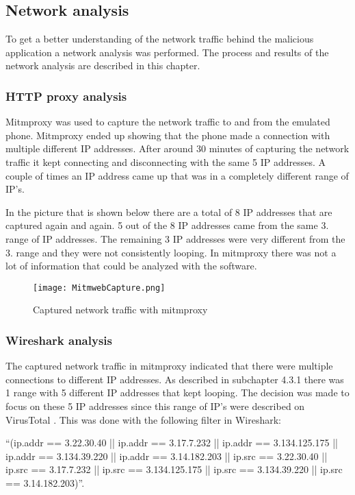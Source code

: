 \subsection{Network analysis}
To get a better understanding of the network traffic behind the malicious application a network analysis was performed. The process and results of the network analysis are described in this chapter.

\subsubsection{HTTP proxy analysis}
Mitmproxy was used to capture the network traffic to and from the emulated phone. Mitmproxy ended up showing that the phone made a connection with multiple different IP addresses. After around 30 minutes of capturing the network traffic it kept connecting and disconnecting with the same 5 IP addresses. A couple of times an IP address came up that was in a completely different range of IP’s. 

In the picture that is shown below there are a total of 8 IP addresses that are captured again and again. 5 out of the 8 IP addresses came from the same 3. range of IP addresses. The remaining 3 IP addresses were very different from the 3. range and they were not consistently looping. In mitmproxy there was not a lot of information that could be analyzed with the software.

\begin{figure}[H]
    \centering
    \texttt{[image: MitmwebCapture.png]}
    \caption{Captured network traffic with mitmproxy}
    \label{jordy-mitmweb}
\end{figure}

\newpage
\subsubsection{Wireshark analysis}
The captured network traffic in mitmproxy indicated that there were multiple connections to different IP addresses. As described in subchapter 4.3.1 there was 1 range with 5 different IP addresses that kept looping. The decision was made to focus on these 5 IP addresses since this range of IP’s were described on VirusTotal . This was done with the following filter in Wireshark:

“(ip.addr == 3.22.30.40 || ip.addr == 3.17.7.232 || ip.addr == 3.134.125.175 || ip.addr == 3.134.39.220 || ip.addr == 3.14.182.203 || ip.src == 3.22.30.40 || ip.src == 3.17.7.232 || ip.src == 3.134.125.175 || ip.src == 3.134.39.220 || ip.src == 3.14.182.203)”. 

